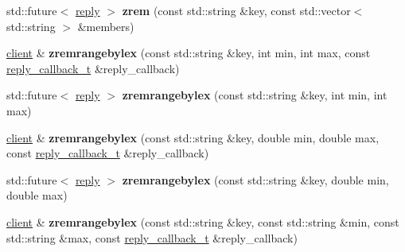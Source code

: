 \begin{DoxyCompactItemize}
\item 
\mbox{\label{classcpp__redis_1_1client_aff2e5ec7005f76869fad79c4e8bd68c8}} 
std\+::future$<$ \mbox{\hyperlink{classcpp__redis_1_1reply}{reply}} $>$ {\bfseries zrem} (const std\+::string \&key, const std\+::vector$<$ std\+::string $>$ \&members)
\item 
\mbox{\label{classcpp__redis_1_1client_aff3c4f11d504ba64a98b6bce9bf319a0}} 
\mbox{\hyperlink{classcpp__redis_1_1client}{client}} \& {\bfseries zremrangebylex} (const std\+::string \&key, int min, int max, const \mbox{\hyperlink{classcpp__redis_1_1client_af7a65eb21aa25230bfbb0b0203c4fc04}{reply\+\_\+callback\+\_\+t}} \&reply\+\_\+callback)
\item 
\mbox{\label{classcpp__redis_1_1client_a9277ebc759190ce6f085a60a98ad3a7c}} 
std\+::future$<$ \mbox{\hyperlink{classcpp__redis_1_1reply}{reply}} $>$ {\bfseries zremrangebylex} (const std\+::string \&key, int min, int max)
\item 
\mbox{\label{classcpp__redis_1_1client_ae03899c0520352eb6a800b9d6c12f2ae}} 
\mbox{\hyperlink{classcpp__redis_1_1client}{client}} \& {\bfseries zremrangebylex} (const std\+::string \&key, double min, double max, const \mbox{\hyperlink{classcpp__redis_1_1client_af7a65eb21aa25230bfbb0b0203c4fc04}{reply\+\_\+callback\+\_\+t}} \&reply\+\_\+callback)
\item 
\mbox{\label{classcpp__redis_1_1client_a6ed8333a10d5c4390f3e52f91c436264}} 
std\+::future$<$ \mbox{\hyperlink{classcpp__redis_1_1reply}{reply}} $>$ {\bfseries zremrangebylex} (const std\+::string \&key, double min, double max)
\item 
\mbox{\label{classcpp__redis_1_1client_a8fe114da4df2dfd2ab5240554444a294}} 
\mbox{\hyperlink{classcpp__redis_1_1client}{client}} \& {\bfseries zremrangebylex} (const std\+::string \&key, const std\+::string \&min, const std\+::string \&max, const \mbox{\hyperlink{classcpp__redis_1_1client_af7a65eb21aa25230bfbb0b0203c4fc04}{reply\+\_\+callback\+\_\+t}} \&reply\+\_\+callback)
\item 
\mbox{\label{classcpp__redis_1_1client_a1350d0df45d5b41c940d782682b41bd9}} 

\end{DoxyCompactItemize}
